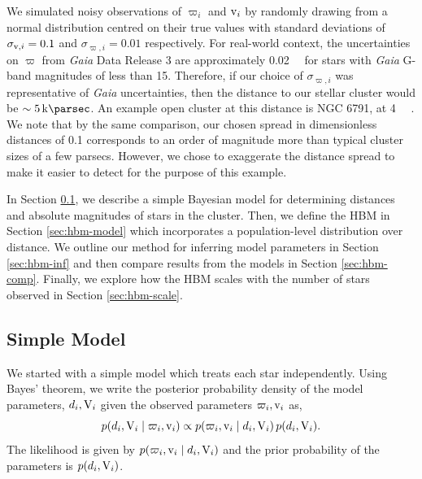 We simulated noisy observations of \(\varpi_i\) and \(\mathrm{v}_i\) by randomly drawing from a normal distribution centred on their true values with standard deviations of \(\sigma_{\mathrm{v},i} = 0.1\) and \(\sigma_{\varpi,i} = 0.01\) respectively. 
For real-world context, the uncertainties on \(\varpi\) from \emph{Gaia} \citep{GaiaCollaboration.Prusti.ea2016} Data Release 3 \citep[][]{GaiaCollaboration.Vallenari.ea2022} are approximately \SI{0.02}{\milli\aarcsec} for stars with \emph{Gaia} G-band magnitudes of less than 15. Therefore, if our choice of \(\sigma_{\varpi,i}\) was representative of \emph{Gaia} uncertainties, then the distance to our stellar cluster would be \(\sim \SI{5}{\kilo\parsec}\). An example open cluster at this distance is NGC 6791, at \SI{4}{\kilo\parsec} \citep{Brogaard.Bruntt.ea2011}. We note that by the same comparison, our chosen spread in dimensionless distances of 0.1 corresponds to an order of magnitude more than typical cluster sizes of a few parsecs. However, we chose to exaggerate the distance spread to make it easier to detect for the purpose of this example.

In Section \ref{sec:simple-model}, we describe a simple Bayesian model for determining distances and absolute magnitudes of stars in the cluster. Then, we define the HBM in Section \ref{sec:hbm-model} which incorporates a population-level distribution over distance. We outline our method for inferring model parameters in Section \ref{sec:hbm-inf} and then compare results from the models in Section \ref{sec:hbm-comp}. Finally, we explore how the HBM scales with the number of stars observed in Section \ref{sec:hbm-scale}.

\subsection{Simple Model}\label{sec:simple-model}

We started with a simple model which treats each star independently. Using Bayes' theorem, we write the posterior probability density of the model parameters, \(d_i, \mathrm{V}_i\) given the observed parameters \(\varpi_i, \mathrm{v}_i\) as,
%
\begin{equation}
    p(d_i, \mathrm{V}_i \mid \varpi_i, \mathrm{v}_i) \propto p(\varpi_i, \mathrm{v}_i \mid d_i, \mathrm{V}_i) \, p(d_i, \mathrm{V}_i).
\end{equation}
%
The likelihood is given by \(p(\varpi_i, \mathrm{v}_i \mid d_i, \mathrm{V}_i)\) and the prior probability of the parameters is \(p(d_i, \mathrm{V}_i)\).

